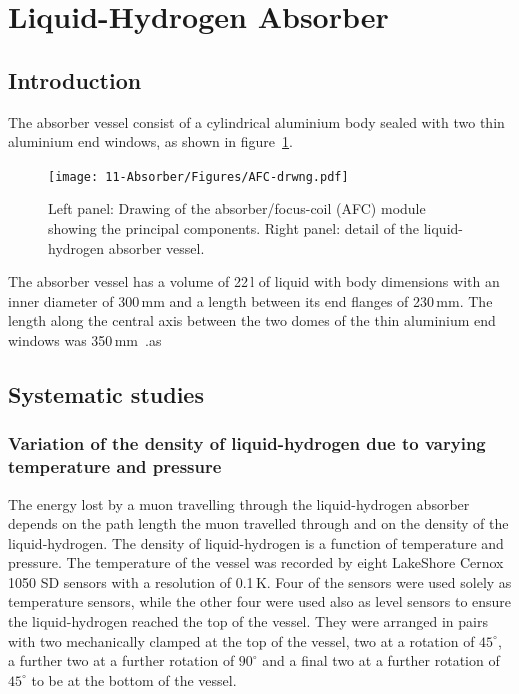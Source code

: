 
\graphicspath{{11-Absorber/Figures/}}

\section{Liquid-Hydrogen Absorber}
\label{Sect:Absorber}

\subsection{Introduction}

The absorber vessel consist of a cylindrical aluminium body sealed with
two thin aluminium end windows, as shown in figure~\ref{Fig:AbsorberVessel:Diag}.
\begin{figure}[htb!]
  \begin{center}
    \texttt{[image: 11-Absorber/Figures/AFC-drwng.pdf]}
  \end{center}
  \caption{
    Left panel: Drawing of the absorber/focus-coil (AFC) module showing the principal components. Right panel: detail of the liquid-hydrogen absorber vessel.
  }
  \label{Fig:AbsorberVessel:Diag}
\end{figure}
The absorber vessel has a volume of 22\,l of liquid with body dimensions with
an inner diameter of 300\,mm and a length between its end
flanges of 230\,mm.  
The length along the central axis between the two domes of the thin aluminium end
windows was 350\,mm~\cite{1748-0221-13-09-T09008}.as


\subsection{Systematic studies}

\subsubsection{Variation of the density of liquid-hydrogen due to varying temperature and pressure}
\label{SubSect:Absorber_temperature}

The energy lost by a muon travelling through the liquid-hydrogen absorber depends on the path length the
muon travelled through and on the density of the liquid-hydrogen. The density of liquid-hydrogen is a function of temperature and pressure. 
The temperature of the vessel was recorded by eight LakeShore Cernox 1050 SD sensors with a resolution of 0.1\,K.
Four of the sensors were used solely as temperature sensors, while the other four were used also as level
sensors to ensure the liquid-hydrogen reached the top of the vessel.
They were arranged in pairs
with two mechanically clamped at the  top of the vessel, two at a rotation of ${45}^{\circ}$, a further two at a further rotation of
${90}^{\circ}$ and a final two at a further rotation of ${45}^{\circ}$ to be at the bottom of the vessel.

